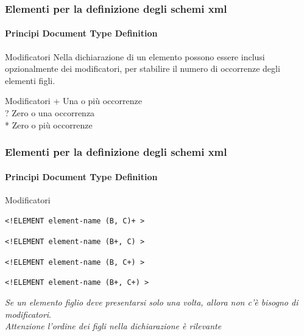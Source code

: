 \begin{frame}
    \frametitle{Elementi per la definizione degli schemi xml}
    \framesubtitle{Principi Document Type Definition}
    \addtocounter{nframe}{1}

    \begin{block}{Modificatori}
        Nella dichiarazione di un elemento possono essere inclusi opzionalmente dei modificatori, per stabilire il numero di occorrenze degli elementi figli.
    \end{block}

    \begin{block}{Modificatori}
     + Una o più occorrenze\\ 
     ? Zero o una occorrenza\\
     * Zero o più occorrenze
    \end{block}
\end{frame}

\begin{frame}
    \frametitle{Elementi per la definizione degli schemi xml}
    \framesubtitle{Principi Document Type Definition}
    \addtocounter{nframe}{1}

    \begin{block}{Modificatori}
        \begin{center} \texttt{<!ELEMENT element-name (B, C)+ >} \end{center}
        \begin{center} \texttt{<!ELEMENT element-name (B+, C) >} \end{center}
        \begin{center} \texttt{<!ELEMENT element-name (B, C+) >} \end{center}
        \begin{center} \texttt{<!ELEMENT element-name (B+, C+) >} \end{center}
    \end{block}

     \textit{Se un elemento figlio deve presentarsi solo una volta, allora non c'è bisogno di modificatori}.
     \\\textit{Attenzione l'ordine dei figli nella dichiarazione è rilevante}
    
\end{frame}

